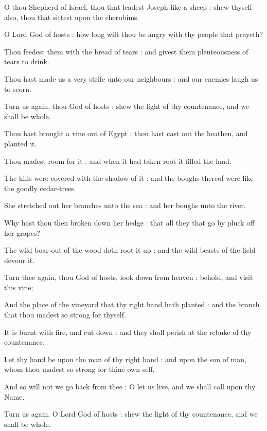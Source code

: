  O thou Shepherd of Israel, thou that leadest Joseph like a sheep : shew thyself also, thou that sittest upon the cherubims.\par
{}
O Lord God of hosts : how long wilt thou be angry with thy people that prayeth?\par
{}Thou feedest them with the bread of tears : and givest them plenteousness of tears to drink.\par
{}Thou hast made us a very strife unto our neighbours : and our enemies laugh us to scorn.\par
{}Turn us again, thou God of hosts : shew the light of thy countenance, and we shall be whole.\par
{}Thou hast brought a vine out of Egypt : thou hast cast out the heathen, and planted it.\par
{}Thou madest room for it : and when it had taken root it filled the land.\par
{}The hills were covered with the shadow of it : and the boughs thereof were like the goodly cedar-trees.\par
{}She stretched out her branches unto the sea : and her boughs unto the river.\par
{}Why hast thou then broken down her hedge : that all they that go by pluck off her grapes?\par
{}The wild boar out of the wood doth root it up : and the wild beasts of the field devour it.\par
{}Turn thee again, thou God of hosts, look down from heaven : behold, and visit this vine;\par
{}And the place of the vineyard that thy right hand hath planted : and the branch that thou madest so strong for thyself.\par
{}It is burnt with fire, and cut down : and they shall perish at the rebuke of thy countenance.\par
{}Let thy hand be upon the man of thy right hand : and upon the son of man, whom thou madest so strong for thine own self.\par
{}And so will not we go back from thee : O let us live, and we shall call upon thy Name.\par
{}Turn us again, O Lord God of hosts : shew the light of thy countenance, and we shall be whole.\par

